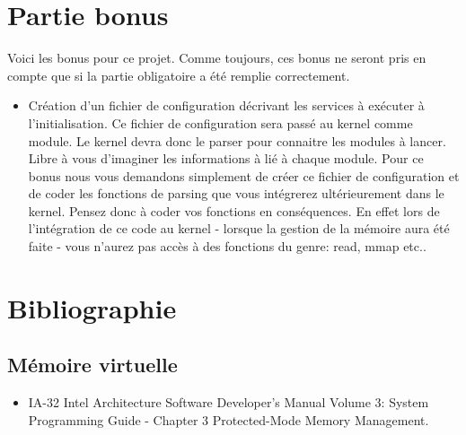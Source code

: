 \documentclass[10pt,a4wide]{article}
\begin{document}
\section{Partie bonus}

Voici les bonus pour ce projet. Comme toujours, ces bonus ne seront pris
en compte que si la partie obligatoire a \'et\'e remplie correctement.

\begin{itemize}
\item Cr\'eation d'un fichier de configuration d\'ecrivant les services \`a
      ex\'ecuter \`a l'initialisation. Ce fichier de configuration
      sera pass\'e au kernel comme module. Le kernel devra donc le parser
      pour connaitre les modules \`a lancer. Libre \`a vous d'imaginer les
      informations \`a li\'e \`a chaque module. Pour ce bonus
      nous vous demandons simplement de cr\'eer ce fichier de configuration
      et de coder les fonctions de parsing que vous int\'egrerez
      ult\'erieurement dans le kernel. Pensez donc \`a coder vos fonctions
      en cons\'equences. En effet lors de l'int\'egration de ce code
      au kernel - lorsque la gestion de la m\'emoire aura \'et\'e faite -
      vous n'aurez pas acc\`es \`a des fonctions du genre: read, mmap etc..
\end{itemize}

\section{Bibliographie}

\subsection{M\'emoire virtuelle}

\begin{itemize}
\item IA-32 Intel Architecture Software Developer's Manual Volume 3:
      System Programming Guide - Chapter 3 Protected-Mode Memory Management.
\end{itemize}
\end{document}
